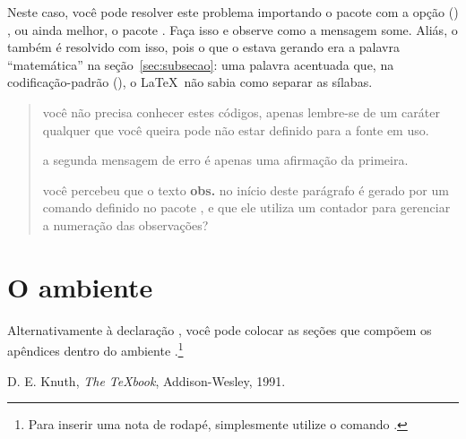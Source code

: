 \documentclass[a4paper,12pt]{report}
\begin{document}
	Neste caso, você pode resolver este problema importando o pacote
		com a opção () , ou ainda melhor,
	o pacote . Faça isso e observe como a mensagem some. Aliás, o
	 também é resolvido com isso, pois o que o estava gerando
	era a palavra ``matemática'' na seção~\ref{sec:subsecao}: uma palavra
	acentuada que, na codificação-padrão (), o \LaTeX\ não sabia
	como separar as sílabas.
	
	\begin{quotation}
		\noindent\obs você não precisa conhecer estes códigos, apenas
		lembre-se de um caráter qualquer que você queira pode não estar definido
		para a fonte em uso.

		\noindent\obs a segunda mensagem de erro é apenas uma afirmação da
		primeira.
		
		\noindent\obs você percebeu que o texto \textbf{obs.} no início deste
		parágrafo é gerado por um comando definido no pacote ,
		e que ele utiliza um contador para gerenciar a numeração das observações?
	\end{quotation}	
	
	\chapter{O ambiente }
	
	Alternativamente à declaração , você pode colocar as seções que
	compõem os apêndices dentro do ambiente .\footnote{Para inserir
	uma nota de rodapé, simplesmente utilize o comando .}

	\begin{thebibliography}{+}
	 D. E. Knuth, \textsl{The \TeX book}, Addison-Wesley, 1991.
	\end{thebibliography}
\end{document}
